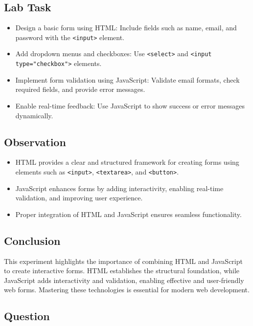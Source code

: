 \documentclass[a4paper,9pt]{article}
\begin{document}
\subsection{Lab Task}

\begin{itemize}
	\item Design a basic form using HTML: Include fields such as name, email, and password with the \texttt{\textless input\textgreater} element.
	\item Add dropdown menus and checkboxes: Use \texttt{\textless select\textgreater} and \texttt{\textless input type="checkbox"\textgreater} elements.
	\item Implement form validation using JavaScript: Validate email formats, check required fields, and provide error messages.
	\item Enable real-time feedback: Use JavaScript to show success or error messages dynamically.
\end{itemize}

\subsection{Observation}
\begin{itemize}
	\item HTML provides a clear and structured framework for creating forms using elements such as \texttt{\textless input\textgreater}, \texttt{\textless textarea\textgreater}, and \texttt{\textless button\textgreater}.
	
	
	\item JavaScript enhances forms by adding interactivity, enabling real-time validation, and improving user experience.
	\item Proper integration of HTML and JavaScript ensures seamless functionality.
\end{itemize}
\subsection{Conclusion}
This experiment highlights the importance of combining HTML and JavaScript to create interactive forms. HTML establishes the structural foundation, while JavaScript adds interactivity and validation, enabling effective and user-friendly web forms. Mastering these technologies is essential for modern web development.

\subsection{Question}
\end{document}
